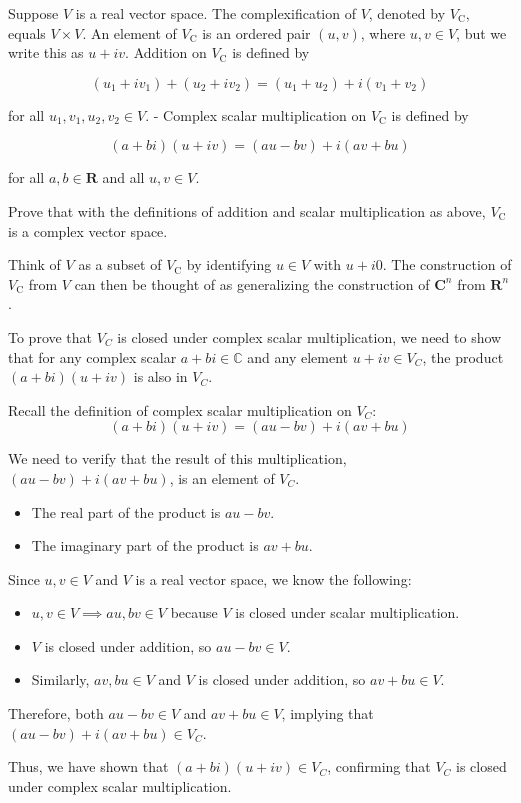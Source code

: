 \begin{exercise}
Suppose $V$ is a real vector space.
The complexification of $V$, denoted by $V_{\mathrm{C}}$, equals $V \times V$. An element of $V_{\mathrm{C}}$ is an ordered pair $(u, v)$, where $u, v \in V$, but we write this as $u+i v$.
Addition on $V_{\mathrm{C}}$ is defined by

\[
\left(u_{1}+i v_{1}\right)+\left(u_{2}+i v_{2}\right)=\left(u_{1}+u_{2}\right)+i\left(v_{1}+v_{2}\right)
\]

for all $u_{1}, v_{1}, u_{2}, v_{2} \in V$.
- Complex scalar multiplication on $V_{\mathrm{C}}$ is defined by

\[
(a+b i)(u+i v)=(a u-b v)+i(a v+b u)
\]

for all $a, b \in \mathbf{R}$ and all $u, v \in V$.

Prove that with the definitions of addition and scalar multiplication as above, $V_{\mathrm{C}}$ is a complex vector space.

Think of $V$ as a subset of $V_{\mathrm{C}}$ by identifying $u \in V$ with $u+i 0$. The construction of $V_{\mathrm{C}}$ from $V$ can then be thought of as generalizing the construction of $\mathbf{C}^{n}$ from $\mathbf{R}^{n}$.
\end{exercise}

\begin{solution}
To prove that \( V_C \) is closed under complex scalar multiplication, we need to show that for any complex scalar \( a + bi \in \mathbb{C} \) and any element \( u + iv \in V_C \), the product \( (a + bi)(u + iv) \) is also in \( V_C \).

Recall the definition of complex scalar multiplication on \( V_C \):
\[ (a + bi)(u + iv) = (au - bv) + i(av + bu) \]

We need to verify that the result of this multiplication, \( (au - bv) + i(av + bu) \), is an element of \( V_C \).

\begin{itemize}
    \item The real part of the product is \( au - bv \).
    \item The imaginary part of the product is \( av + bu \).
\end{itemize}

Since \( u, v \in V \) and \( V \) is a real vector space, we know the following:
\begin{itemize}
    \item \( u, v \in V \implies au, bv \in V \) because \( V \) is closed under scalar multiplication.
    \item \( V \) is closed under addition, so \( au - bv \in V \).
    \item Similarly, \( av, bu \in V \) and \( V \) is closed under addition, so \( av + bu \in V \).
\end{itemize}

Therefore, both \( au - bv \in V \) and \( av + bu \in V \), implying that \( (au - bv) + i(av + bu) \in V_C \).

Thus, we have shown that \( (a + bi)(u + iv) \in V_C \), confirming that \( V_C \) is closed under complex scalar multiplication.

\end{solution}


